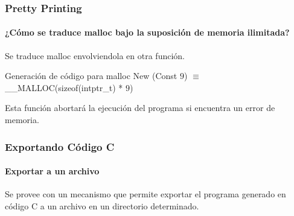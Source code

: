 \begin{frame}
\frametitle{Pretty Printing}
\framesubtitle{¿Cómo se traduce malloc bajo la suposición de memoria ilimitada?}

Se traduce malloc envolviendola en otra función.

\begin{block}{Generación de código para malloc}
New (Const $9$) $\equiv$ \_\_MALLOC(sizeof(intptr\_t) * $9$)
\end{block}

\bigskip

Esta función abortará la ejecución del programa si encuentra un error de memoria.


\end{frame}


\begin{frame}
\frametitle{Exportando Código C}
\framesubtitle{Exportar a un archivo}

Se provee con un mecanismo que permite exportar el programa generado en código C a un archivo en un directorio determinado.


\end{frame}

